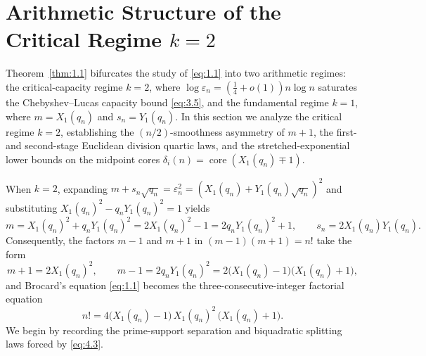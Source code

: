 \documentclass[11pt,reqno]{amsart}
\theoremstyle{remark}
\numberwithin{equation}{section}
\DeclareMathOperator{\core}{core}
\begin{document}
\section{Arithmetic Structure of the Critical Regime $k = 2$}\label{sec:4}

Theorem~\ref{thm:1.1} bifurcates the study of \eqref{eq:1.1} into two arithmetic regimes: the critical-capacity regime $k = 2$, where $\log \varepsilon_n = (\frac{1}{4} + o(1))n\log n$ saturates the Chebyshev--Lucas capacity bound \eqref{eq:3.5}, and the fundamental regime $k = 1$, where $m = X_1(q_n)$ and $s_n = Y_1(q_n)$. In this section we analyze the critical regime $k = 2$, establishing the $(n/2)$-smoothness asymmetry of $m + 1$, the first- and second-stage Euclidean division quartic laws, and the stretched-exponential lower bounds on the midpoint cores $\delta_i(n) = \core(X_1(q_n) \mp 1)$.

When $k = 2$, expanding $m + s_n\sqrt{q_n} = \varepsilon_n^2 = (X_1(q_n) + Y_1(q_n)\sqrt{q_n})^2$ and substituting $X_1(q_n)^2 - q_n Y_1(q_n)^2 = 1$ yields
\begin{equation}\label{eq:4.1}
m = X_1(q_n)^2 + q_n Y_1(q_n)^2 = 2X_1(q_n)^2 - 1 = 2q_n Y_1(q_n)^2 + 1, \qquad s_n = 2X_1(q_n)Y_1(q_n).
\end{equation}
Consequently, the factors $m - 1$ and $m + 1$ in $(m - 1)(m + 1) = n!$ take the form
\begin{equation}\label{eq:4.2}
m + 1 = 2X_1(q_n)^2, \qquad m - 1 = 2q_n Y_1(q_n)^2 = 2\bigl(X_1(q_n) - 1\bigr)\bigl(X_1(q_n) + 1\bigr),
\end{equation}
and Brocard's equation \eqref{eq:1.1} becomes the three-consecutive-integer factorial equation
\begin{equation}\label{eq:4.3}
n! = 4\bigl(X_1(q_n) - 1\bigr)\,X_1(q_n)^2\,\bigl(X_1(q_n) + 1\bigr).
\end{equation}
We begin by recording the prime-support separation and biquadratic splitting laws forced by \eqref{eq:4.3}.
\end{document}
